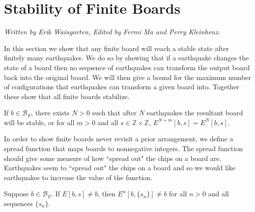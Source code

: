 \documentclass[runningheads,a4paper]{llncs}
\begin{document}
\section{Stability of Finite Boards}
\label{Stability of Finite Boards}
\emph{Written by Erik Waingarten, Edited by Fermi Ma and Perry Kleinhenz.}

In this section we show that any finite board will reach a stable state after finitely many earthquakes.
We do so by showing that if a earthquake changes the state of a board then no sequence of earthquakes can transform the output board back into the original board. 
We will then give a bound for the maximum number of configurations that earthquakes can transform a given board into. 
Together these show that all finite boards stabilize. 
\begin{theorem}
\label{finitestability}
If $b \in \mathcal{B}_F$, there exists $N> 0$ such that after $N$ earthquakes the resultant board will be stable, or for all $m > 0$ and all $s \in \mathbb{Z} \times \mathbb{Z}$, $E^{N+m}[b,s] = E^N[b,s]$.
\end{theorem}

In order to show finite boards never revisit a prior arrangement, we define a spread function that maps boards to nonnegative integers. The spread function should give some measure of how ``spread out" the chips on a board are. Earthquakes seem to ``spread out" the chips on a board and so we would like earthquakes to increase the value of the function. 

\begin{lemma}
Suppose $b \in \mathcal{B}_F$. If $E[b, s] \neq b$, then $E^n[b, \{s_n\}] \neq b$ for all $n > 0$ and all sequences $\{s_n\}$.
\end{lemma}
\end{document}
